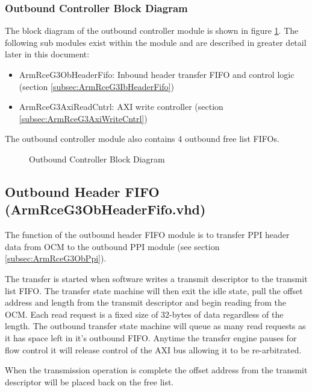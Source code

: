 \documentclass[11pt]{article}
\begin{document}
\subsubsection{Outbound Controller Block Diagram}

The block diagram of the outbound controller module is shown in figure \ref{fig:ob_cntrl_block}. The following sub modules
exist within the module and are described in greater detail later in this document:

\begin{itemize}
   \item ArmRceG3ObHeaderFifo: Inbound header transfer FIFO and control logic (section \ref{subsec:ArmRceG3IbHeaderFifo})
   \item ArmRceG3AxiReadCntrl: AXI write controller (section \ref{subsec:ArmRceG3AxiWriteCntrl})
\end{itemize}

The outbound controller module also contains 4 outbound free list FIFOs.

\begin{figure}[H]
   \centering
   \caption{Outbound Controller Block Diagram}
   \label{fig:ob_cntrl_block}
\end{figure}

\subsection{Outbound Header FIFO (ArmRceG3ObHeaderFifo.vhd)}
\label{subsec:ArmRceG3ObHeaderFifo}

The function of the outbound header FIFO module is to transfer PPI header data from OCM to the outbound PPI
module (see section \ref{subsec:ArmRceG3ObPpi}).

The transfer is started when software writes a transmit descriptor to the transmit list FIFO. The transfer state
machine will then exit the idle state, pull the offset address and length from the transmit descriptor and begin reading
from the OCM. Each read request is a fixed size of 32-bytes of data regardless of the length. The outbound 
transfer state machine will queue as many read requests as it has space left in it's outbound FIFO. Anytime the
transfer engine pauses for flow control it will release control of the AXI bus allowing it to be re-arbitrated. 

When the transmission operation is complete the offset address from the transmit descriptor will be placed back
on the free list.
\end{document}
